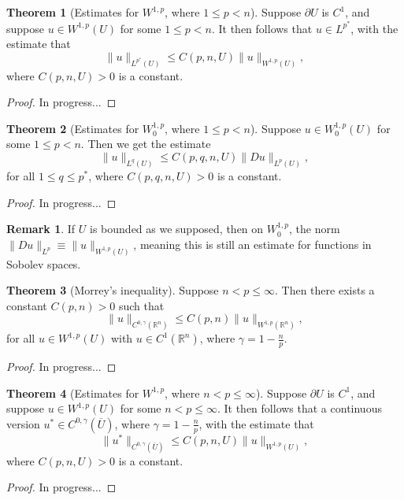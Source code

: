 \documentclass[11pt]{article}
\theoremstyle{definition}
\newtheorem*{theorem}{Theorem}
\newtheorem*{remark}{Remark}
\begin{document}
\begin{theorem}[Estimates for $W^{1,p}$, where $1 \leq p < n$]
Suppose $\partial U$ is $C^1$,
and suppose $u \in W^{1,p}(U)$ for some $1 \leq p < n$. It then follows that $u \in L^{p^*}$, with the estimate that
	\[\|u\|_{L^{p^*}(U)} \leq C(p,n,U)\|u\|_{W^{1,p}(U)},\]
where $C(p,n,U) > 0$ is a constant.
\end{theorem}
\begin{proof}
In progress...
\end{proof}

\begin{theorem}[Estimates for $W_{0}^{1,p}$, where $1 \leq p < n$]
	Suppose $u \in W_{0}^{1,p}(U)$ for some $1 \leq p < n$. Then we get the estimate
	\[\|u\|_{L^{q}(U)} \leq C(p,q,n,U)\|Du\|_{L^{p}(U)},\]
	for all $1 \leq q \leq p^*$, where $C(p,q,n,U) > 0$ is a constant.
\end{theorem}
\begin{proof}
In progress...
\end{proof}

\begin{remark}
If $U$ is bounded as we supposed, then on $W_{0}^{1,p}$, the norm $\|Du\|_{L^{p}} \equiv \|u\|_{W^{1,p}(U)}$,
meaning this is still an estimate for functions in Sobolev spaces.
\end{remark}

\begin{theorem}[Morrey's inequality]
Suppose $n < p \leq \infty$. Then there exists a constant $C(p,n) > 0$ such that
	\[\|u\|_{C^{0,\gamma}(\mathbb{R}^n)} \leq C(p,n)\|u\|_{W^{1,p}(\mathbb{R}^n)},\]
for all $u \in W^{1,p}(U)$ with $u \in C^1(\mathbb{R}^n)$, where $\gamma = 1 - \frac{n}{p}$.
\end{theorem}
\begin{proof}
In progress...
\end{proof}

\begin{theorem}[Estimates for $W^{1,p}$, where $n < p \leq \infty$]
Suppose $\partial U$ is $C^1$,
	and suppose $u \in W^{1,p}(U)$ for some $n < p \leq \infty$. It then follows that a continuous version $u^* \in C^{0,\gamma}(\overline{U})$,
where $\gamma = 1 - \frac{n}{p}$, with the estimate that
	\[\|u^*\|_{C^{0,\gamma}(\overline{U})} \leq C(p,n,U)\|u\|_{W^{1,p}(U)},\]
where $C(p,n,U) > 0$ is a constant.
\end{theorem}
\begin{proof}
In progress...
\end{proof}
\end{document}
